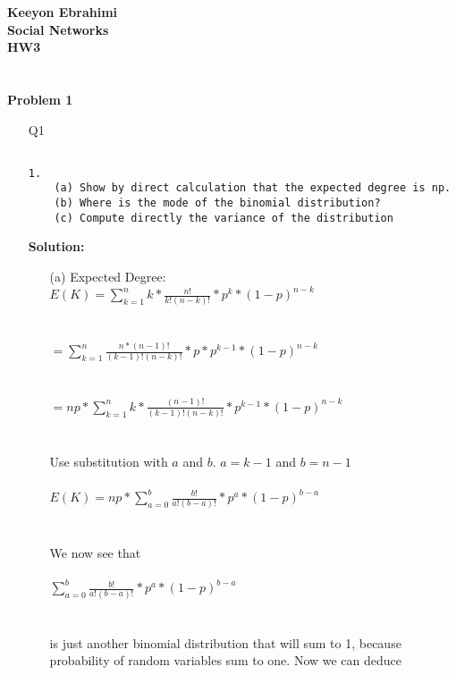 \documentclass[ruled]{article}
\begin{document}
\textbf{Keeyon Ebrahimi}\\
\textbf{Social Networks}\\
\textbf{HW3}\\ \\ \\
\textbf{Problem 1}

\begin{itemize}
\item[Q1] 
\begin{verbatim}

1. 
    (a) Show by direct calculation that the expected degree is np.
    (b) Where is the mode of the binomial distribution?
    (c) Compute directly the variance of the distribution

\end{verbatim}
\textbf{Solution: }\\
\begin{itemize}
\item[(a)] Expected Degree: \\

 {\Large $E(K) = \sum\limits_{k=1}^n k* \frac{n!}{k! (n - k)!} * p^k * (1-p)^{n - k}$   } \\ \\ \\
 {\Large $= \sum\limits_{k=1}^n \frac{n * (n-1)!}{(k-1)! (n - k)!} * p * p^{k-1} * (1-p)^{n - k}$   } \\ \\ \\
 {\Large $= np * \sum\limits_{k=1}^n k* \frac{(n-1)!}{(k-1)! (n - k)!} * p^{k-1} * (1-p)^{n - k}$   } \\ \\ \\

Use substitution with $a$ and $b$.  $a = k-1$ and $b = n-1$\\ \\

{\Large $E(K) = np * \sum\limits_{a=0}^b \frac{b!}{a! (b - a)!} * p^a * (1-p)^{b - a}$   } \\ \\ \\

{\Large We now see that \\ \\ $ \sum\limits_{a=0}^b \frac{b!}{a! (b - a)!} * p^a * (1-p)^{b - a}$ \\ \\ \\ is just another binomial distribution that will sum to 1, because probability of random variables sum to one.  Now we can deduce } 
\\ \\ \\ 


\end{itemize}
\end{itemize}
\end{document}
